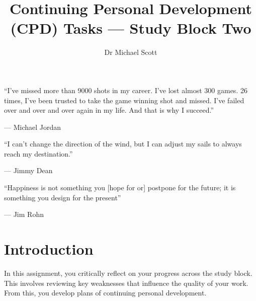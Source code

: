 \documentclass{../../fal_assignment}
\title{Continuing Personal Development (CPD) Tasks --- Study Block Two}
\author{Dr Michael Scott}
\begin{document}
\maketitle
%    
\begin{marginquote}
    ``I've missed more than 9000 shots in my career. I've lost almost 300 games. 26 times, I've been trusted to take the game winning shot and missed. I've failed over and over and over again in my life. And that is why I succeed.''
    
    --- Michael Jordan

    \marginquoterule

    ``I can't change the direction of the wind, but I can adjust my sails to always reach my destination.''
    
    --- Jimmy Dean
    
    \marginquoterule

    ``Happiness is not something you [hope for or] postpone for the future; it is something you design for the present''
    
    --- Jim Rohn
\end{marginquote}

\section*{Introduction}

In this assignment, you critically reflect on your progress across the study block. This involves reviewing key weaknesses that influence the quality of your work. From this, you develop plans of continuing personal development.
\end{document}
